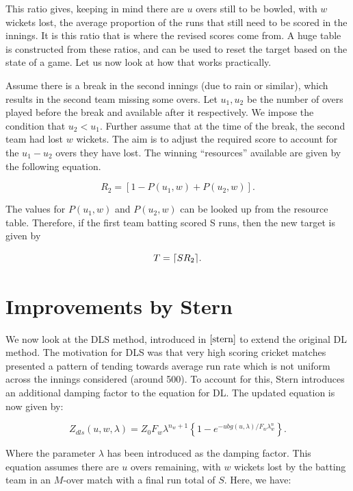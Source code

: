 This ratio gives, keeping in mind there are $u$ overs still to be bowled, with $w$ wickets
lost, the average proportion of the runs that still need to be scored in the innings. 
It is this ratio that is where the revised scores come from. A huge table is constructed from these 
ratios, and can be used to reset the target based on the state of a game. Let us now look at how that works
practically.

\begin{example}
    \label{dlExMain}
    Assume there is a break in the second innings (due to rain or similar), which results in the second team missing some overs.
    Let $u_1, u_2$ be the number of overs played before the break and available after it respectively. We impose the condition
    that $u_2 < u_1$. Further assume that at the time of the break, the second team had lost $w$ wickets. The aim is to adjust the required score to account
    for the $u_1 - u_2$ overs they have lost. The winning ``resources'' available are given by the following equation.

    \[
        R_2 = [1-P(u_1,w)+P(u_2,w)].
    \]  

    The values for $P(u_1,w)$ and $P(u_2,w)$ can be looked up from the resource table.
    Therefore, if the first team batting scored S runs, then the new target is given by

    \[
        T = \lceil SR_2\rceil.
    \]  
\end{example}

\section{Improvements by Stern}
We now look at the DLS method, introduced in $\cite{stern}$ to extend the original DL method. The motivation for DLS was that very high scoring
cricket matches presented a pattern of tending towards average run rate which is not uniform across the innings considered (around 500). To account for 
this, Stern introduces an additional damping factor to the equation for DL. The updated equation is now given by:

\begin{equation}
    \label{dls}
    Z_{dls}(u,w,\lambda) = Z_0F_w\lambda^{n_w+1} \left\{ 1-e^{-ubg(u,\lambda)/F_w\lambda^n_w} \right\}.
\end{equation}

Where the parameter $\lambda$ has been introduced as the damping factor.
This equation assumes there are $u$ overs remaining, with $w$ wickets lost by the batting team in an $M$-over match with a final run total of $S$. Here, we have:

